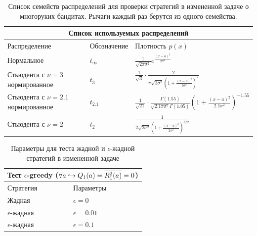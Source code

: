 \begin{table}
\centering
\renewcommand{\arraystretch}{1.5}
\begin{tabular}{ |m{4cm}||m{2.1cm}|m{6cm}|  }
 \hline
 \multicolumn{3}{|c|}{Список используемых распределений} \\
 \hline
 Распределение & Обозначение & Плотность $p(x)$ \\
 \hline
  Нормальное   &  $t_{\infty} $&  $\frac{1}{\sqrt{2\pi \sigma^2}}e^{\frac{(x-a)^2}{2\sigma^2}}$ \\
 \hline
 Стьюдента с $\nu=3$ нормированное & $t_{3}$ & $\frac{1}{\sqrt{3}} \cdot \frac{2}{\pi \sqrt{3\sigma^2} \left( 1 + \frac{(x-a)^2}{3\sigma^2} \right)^2}$ \\
 \hline
 Стьюдента с $\nu=2.1$ нормированное & $t_{2.1}$ & $\frac{1}{\sqrt{21}} \cdot \frac{\Gamma(1.55)}{\sqrt{2.1 \pi \sigma^2} \Gamma(1.05)} \left( 1 + \frac{(x-a)^2}{2.1 \sigma^2} \right)^{-1.55}$ \\
 \hline
 Стьюдента с $\nu=2$ & $t_2$ & $\frac{1}{2\sqrt{2\sigma^2} \left( 1 + \frac{(x-a)^2}{2\sigma^2} \right)^{3/2}}$ \\
 \hline
\end{tabular}
\caption{Список семейств распределений для проверки стратегий в измененной задаче о многоруких бандитах. Рычаги каждый раз берутся из одного семейства.}
\label{table:aversion_distribution_family}
\end{table}


\begin{table}
\centering
\renewcommand{\arraystretch}{1.3}
\begin{tabular}{ |m{3cm}|m{5cm}|  }
 \hline
 \multicolumn{2}{|c|}{Тест $\epsilon$-greedy ($\forall a \hookrightarrow Q_1(a) = \overline{R_1^2(a)} = 0$)} \\
 \hline
 Стратегия & Параметры \\
 \hline
  Жадная   &  $\epsilon = 0$ \\
 \hline
 $\epsilon$-жадная & $\epsilon = 0.01$ \\
 \hline
 $\epsilon$-жадная & $\epsilon = 0.1$ \\
 \hline
\end{tabular}
\caption{Параметры для теста жадной и $\epsilon$-жадной стратегий в измененной задаче}
\label{table:aversion_greedy}
\end{table}

